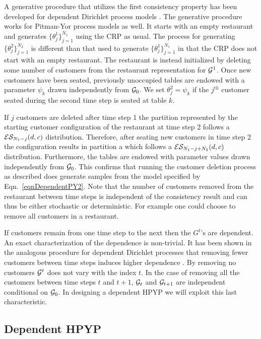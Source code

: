 A generative procedure that utilizes the first consistency property has been developed for dependent Dirichlet process models \cite{Caron2007}.  The generative procedure works for Pitman-Yor process models as well. It starts with an empty restaurant and generates $\{ \theta_j^1\}_{j= 1}^{N_1}$ using the CRP as usual.  The process for generating $\{ \theta_j^2\}_{j= 1}^{N_2}$ is different than that used to generate $\{ \theta_j^1\}_{j= 1}^{N_1}$ in that the CRP does not start with an empty restaurant.  The restaurant is instead initialized by deleting some number of customers from the restaurant representation for $\G^1$.  Once new customers have been seated, previously unoccupied tables are endowed with a parameter $\psi_k$ drawn independently from $\G_0$.  We set $\theta^2_j = \psi_k$ if  the $j^{th}$ customer seated during the second time step is seated at table $k$. 

If $j$ customers are deleted after time step 1 the partition represented by the starting customer configuration of the restaurant at time step 2 follows a $\ES_{N_1- j}(d,c)$ distribution.  Therefore, after seating new customers in time step 2 the configuration results in partition a which follows a $\ES_{N_1 - j + N_2}(d,c)$ distribution. Furthermore, the tables are endowed with parameter values drawn independently from $\G_0$.  This confirms that running the customer deletion process as described does generate samples from the model specified by Eqn.~\ref{eqnDependentPY2}. Note that the number of customers removed from the restaurant between time steps is independent of the consistency result and can thus be either stochastic or deterministic. For example one could choose to remove all customers in a restaurant.

If customers remain from one time step to the next then the $G^t$'s are dependent.  An exact characterization of the dependence is non-trivial.   It has been shown in the analogous procedure for dependent Dirichlet processes that removing fewer customers between time steps induces higher dependence \cite{Caron2007}.  By removing no customers $\G^t$ does not vary with the index $t$.  In the case of removing all the customers between time steps $t$ and $t+1$,  $\G_t$ and $\G_{t+1}$ are independent conditional on $\G_0$.  In designing a dependent HPYP we will exploit this last characteristic.

\subsection{Dependent HPYP}
\label{sec:dhpyp}

